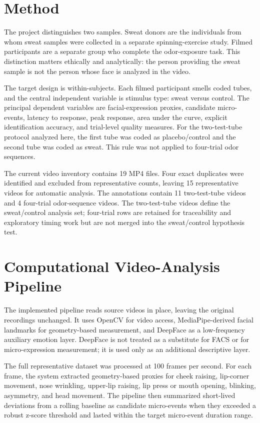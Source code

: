 \documentclass[11pt]{article}
\begin{document}
\section{Method}
The project distinguishes two samples. Sweat donors are the individuals from whom sweat samples were collected in a separate spinning-exercise study. Filmed participants are a separate group who complete the odor-exposure task. This distinction matters ethically and analytically: the person providing the sweat sample is not the person whose face is analyzed in the video.

The target design is within-subjects. Each filmed participant smells coded tubes, and the central independent variable is stimulus type: sweat versus control. The principal dependent variables are facial-expression proxies, candidate micro-events, latency to response, peak response, area under the curve, explicit identification accuracy, and trial-level quality measures. For the two-test-tube protocol analyzed here, the first tube was coded as placebo/control and the second tube was coded as sweat. This rule was not applied to four-trial odor sequences.

The current video inventory contains 19 MP4 files. Four exact duplicates were identified and excluded from representative counts, leaving 15 representative videos for automatic analysis. The annotations contain 11 two-test-tube videos and 4 four-trial odor-sequence videos. The two-test-tube videos define the sweat/control analysis set; four-trial rows are retained for traceability and exploratory timing work but are not merged into the sweat/control hypothesis test.

\section{Computational Video-Analysis Pipeline}
The implemented pipeline reads source videos in place, leaving the original recordings unchanged. It uses OpenCV for video access, MediaPipe-derived facial landmarks for geometry-based measurement, and DeepFace as a low-frequency auxiliary emotion layer. DeepFace is not treated as a substitute for FACS or for micro-expression measurement; it is used only as an additional descriptive layer.

The full representative dataset was processed at 100 frames per second. For each frame, the system extracted geometry-based proxies for cheek raising, lip-corner movement, nose wrinkling, upper-lip raising, lip press or mouth opening, blinking, asymmetry, and head movement. The pipeline then summarized short-lived deviations from a rolling baseline as candidate micro-events when they exceeded a robust z-score threshold and lasted within the target micro-event duration range.
\end{document}
